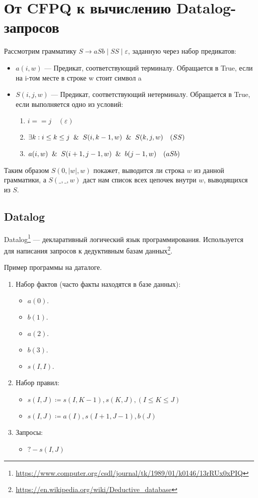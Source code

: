 \section{От CFPQ к вычислению Datalog-запросов}\label{Subsection Datalog}
Рассмотрим грамматику  $S \rightarrow aSb \mid SS \mid \varepsilon$, заданную через набор предикатов:
\begin{itemize}
	\item $a(i, w)$ --- Предикат, соответствующий терминалу. Обращается в True, если на i-том месте в строке w стоит символ a
	\item $S(i, j, w)$ --- Предикат, соответствующий нетерминалу. Обращается в True, если выполняется одно из условий:
	\begin{enumerate}
		\item $i == j \quad(\varepsilon)$
		\item $\exists k: i \leq k \leq j \And S(i, k - 1, w) \And S(k, j, w)  \quad (SS)$
		\item  ${a(i, w) \And S(i+1, j-1, w) \And b(j-1, w)} \quad (aSb)$
	\end{enumerate}
\end{itemize}

Таким образом $S(0,|w|,w)$ покажет, выводится ли строка $w$ из данной грамматики,
а $S(\_,\_,w)$ даст нам список всех цепочек внутри $w$, выводящихся из $S$.

\subsection{Datalog}
Datalog\cite{Datalog}\footnote{\url{https://www.computer.org/csdl/journal/tk/1989/01/k0146/13rRUx0xPIQ}} --- декларативный логический язык программирования. Используется для написания запросов к дедуктивным базам данных\footnote{\url{https://en.wikipedia.org/wiki/Deductive_database}}. 

\begin{example}
	Пример программы на даталоге.
	\begin{enumerate}
		\item Набор фактов (часто факты находятся в базе данных):
		\begin{itemize}
			\item $a(0).$
			\item $b(1).$
			\item $a(2).$
			\item $b(3).$
			\item $s(I, I).$
		\end{itemize}
		\item Набор правил:
		\begin{itemize}
			\item $s(I, J) \coloneq s(I, K-1), s(K,J), (I \leq K \leq J)$
			\item $s(I,J)\coloneq a(I), s(I+1, J-1),b(J)$
		\end{itemize}
		\item Запросы:
		\begin{itemize}
			\item $?- s(I, J)$
		\end{itemize}
	\end{enumerate}
\end{example}

